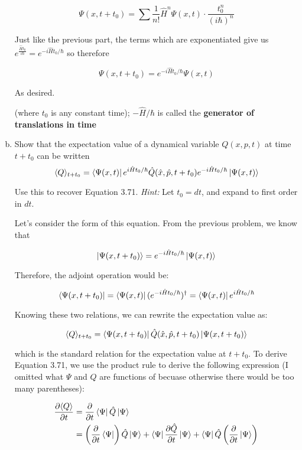 \documentclass[10pt]{article}
\begin{document}
\begin{enumerate}[(a)]
\begin{solution}
            \[\Psi(x, t + t_0) = \sum \frac{1}{n!} \hat H^n \Psi(x, t) \cdot \frac{t_0^n}{(i\hbar)^n}\]

            Just like the previous part, the terms which are exponentiated give us $e^{\frac{\hat Ht_0}{i\hbar}} = e^{-i\hat H t_0/\hbar}$ so therefore

            \[ \Psi(x, t + t_0) = e^{-i\hat H t_0/\hbar} \Psi(x, t)\]


            As desired.  
        \end{solution}

        (where $t_0$ is any constant time); $-\hat H/\hbar$ is called the \textbf{generator of translations in time}
        \item Show that the expectation value of a dynamical variable $Q(x, p, t)$ at time $t + t_0$ can be written
        \[ \langle Q \rangle_{t + t_0} = \bra{\Psi(x, t)}e^{i\hat H t_0/\hbar} \hat Q(\hat x, \hat p, t + t_0) e^{-i\hat H t_0/\hbar}\ket{\Psi(x, t)}\]

        Use this to recover Equation 3.71. \textit{Hint:} Let $t_0 = dt$, and expand to first order in $dt$.

        \begin{solution}
            Let's consider the form of this equation. From the previous problem, we know that 

            \[ \ket {\Psi(x, t + t_0)} = e^{-i\hat H t_0/\hbar}\ket {\Psi(x, t)}\]

            Therefore, the adjoint operation would be:

            \[ \bra{\Psi(x, t + t_0)} = \bra{\Psi(x, t)} (e^{-i\hat H t_0/\hbar})^\dagger = \bra{\Psi(x, t)} e^{i\hat H t_0/\hbar}\] 

            Knowing these two relations, we can rewrite the expectation value as: 

            \[ \langle Q \rangle_{t + t_0} = \bra{\Psi(x, t + t_0)} \hat Q(\hat x, \hat p, t + t_0) \ket{\Psi(x, t + t_0)}\] 

            which is the standard relation for the expectation value at $t + t_0$. To derive Equation 3.71, we use the product rule to derive the following expression (I omitted what $\Psi$ and $Q$ are functions of becuase otherwise there would be too many parentheses): 

            \begin{align*}
                \frac{\partial \langle Q \rangle}{\partial t} &= \frac{\partial}{\partial t}\bra{\Psi} \hat Q \ket{\Psi}\\
                &= \left(\frac{\partial}{\partial t}\bra{\Psi}\right) \hat Q\ket{\Psi} + \bra{\Psi} \frac{\partial \hat Q}{\partial t}\ket {\Psi} + \bra{\Psi} \hat Q \left(\frac{\partial}{\partial t} \ket {\Psi}\right)
            \end{align*}


\end{solution}
\end{enumerate}
\end{document}
